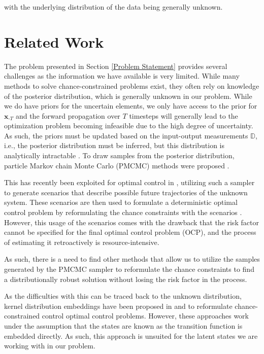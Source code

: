with the underlying distribution of the data being generally unknown.

\section{Related Work} \label{Related Work}


The problem presented in Section \ref{Problem Statement} provides several challenges as the information we have available is very limited. While many methods to solve chance-constrained problems exist, they often rely on knowledge of the posterior distribution, which is generally unknown in our problem. While we do have priors for the uncertain elements, we only have access to the prior for $\boldsymbol{x}_{\text{-}T}$ and the forward propagation over $T$ timesteps will generally lead to the optimization problem becoming infeasible due to the high degree of uncertainty. As such, the priors must be updated based on the input-output measurements $\mathbb{D}$, i.e., the posterior distribution must be inferred, but this distribution is analytically intractable \cite{Andrieu_10}. To draw samples from the posterior distribution, particle Markov chain Monte Carlo (PMCMC) methods were proposed \cite{Andrieu_10}. 

This has recently been exploited for optimal control in \cite{Robert_24}, utilizing such a sampler to generate scenarios that describe possible future trajectories of the unknown system. These scenarios are then used to formulate a deterministic optimal control problem by reformulating the chance constraints with the scenarios \cite{Garatti_22}. However, this usage of the scenarios comes with the drawback that the risk factor cannot be specified for the final optimal control problem (OCP), and the process of estimating it retroactively is resource-intensive.

As such, there is a need to find other methods that allow us to utilize the samples generated by the PMCMC sampler to reformulate the chance constraints to find a distributionally robust solution without losing the risk factor in the process. 

As the difficulties with this can be traced back to the unknown distribution, kernel distribution embeddings have been proposed in \cite{Adam_21} and \cite{Adam_22} to reformulate chance-constrained control optimal control problems. However, these approaches work under the assumption that the states are known as the transition function is embedded directly. As such, this approach is unsuited for the latent states we are working with in our problem.

